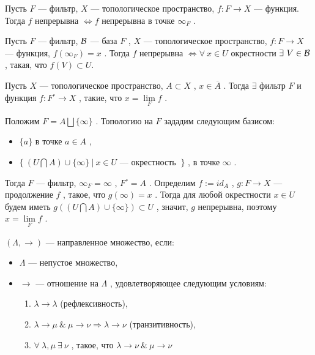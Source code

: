 \SSsect Пусть \( F \) --- фильтр, \( X \) --- топологическое пространство, \( f: F \rightarrow X \) --- функция. Тогда \( f \) непрерывна \( \Leftrightarrow f \) непрерывна в точке \( \infty_F \) .

\SSsect Пусть \( F \) --- фильтр, \( \mathcal{B} \) --- база \( F \) , \( X \) --- топологическое пространство, \( f: F \rightarrow X \) --- функция, \( f(\infty_F)=x \) . Тогда \( f \) непрерывна \( \Leftrightarrow \forall~x \in U \) окрестности \( \exists~V \in \mathcal{B} \) , такая, что \( f(V) \subset U \).

\SSsect[!] Пусть \( X \) --- топологическое пространство, \( A \subset X \) , \( x \in \overline{A} \) . Тогда \( \exists \) фильтр \( F \) и функция \( f: F^\circ \rightarrow X \) , такие, что \( x = \lim\limits_{F} f \) .

\SSproof

Положим \( F = A \bigsqcup \{\infty\} \) . Топологию на \( F \) зададим следующим базисом:
\begin{itemize}[label=]
\item \( \{a\} \) в точке \( a \in A \) ,
\item \( \{~( U \bigcap A ) \cup \{\infty\} ~|~ x \in U \) --- окрестность \( ~\} \) , в точке \( \infty \) .
\end{itemize}

Тогда \( F \) --- фильтр, \( \infty_F=\infty \) , \( F^\circ=A \) . Определим \( f:=id_A \) , \( g: F \rightarrow X \) --- продолжение \( f \) , такое, что \( g(\infty)=x \) . Тогда для любой окрестности \( x \in U \) будем иметь \( g(( U \bigcap A ) \cup \{\infty\}) \subset U \) , значит, \( g \) непрерывна, поэтому \( x = \lim\limits_{F} f \) .

\SSendp

\SSsect[def] \( (\Lambda,\rightarrow) \) --- направленное множество, если:
\begin{itemize}[label=]
\item \( \Lambda \) --- непустое множество,   
\item \( \rightarrow \) --- отношение на \( \Lambda \) , удовлетворяющее следующим условиям:
\begin{enumerate}[label={\alph*)}]
\item \( \lambda \rightarrow \lambda \) (рефлексивность),
\item \( \lambda \rightarrow \mu ~\&~ \mu \rightarrow \nu \Rightarrow \lambda \rightarrow \nu \) (транзитивность),
\item \( \forall~\lambda,\mu ~\exists~ \nu \) , такое, что \( \lambda \rightarrow \nu ~\&~ \mu \rightarrow \nu \)
\end{enumerate}
\end{itemize}

